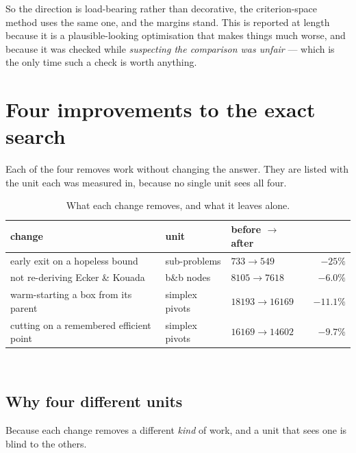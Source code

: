 \documentclass[11pt,a4paper]{article}
\begin{document}
So the direction is load-bearing rather than decorative, the criterion-space
method uses the same one, and the margins stand.  This is reported at length
because it is a plausible-looking optimisation that makes things much worse,
and because it was checked while \emph{suspecting the comparison was unfair} ---
which is the only time such a check is worth anything.

\section{Four improvements to the exact search}

Each of the four removes work without changing the answer.  They are listed
with the unit each was measured in, because no single unit sees all four.

\begin{table}[h]
\centering
\caption{What each change removes, and what it leaves alone.}
\begin{tabular}{lllr}
\toprule
change & unit & before $\to$ after & \\
\midrule
early exit on a hopeless bound & sub-problems & $733 \to 549$ & $-25\%$ \\
not re-deriving Ecker \& Kouada & b\&b nodes & $8105 \to 7618$ & $-6.0\%$ \\
warm-starting a box from its parent & simplex pivots & $18193 \to 16169$ & $-11.1\%$ \\
cutting on a remembered efficient point & simplex pivots & $16169 \to 14602$ & $-9.7\%$ \\
\bottomrule
\end{tabular}
\end{table}

\begin{center}
\\[2pt]
\end{center}

\subsection{Why four different units}

Because each change removes a different \emph{kind} of work, and a unit that
sees one is blind to the others.
\end{document}
